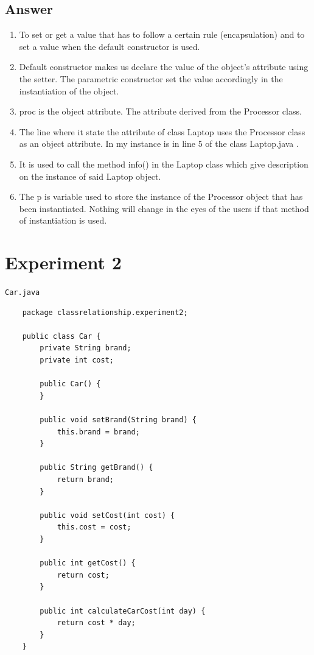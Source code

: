 \documentclass[12pt,titlepage]{article}
\begin{document}
\subsection{Answer}
\begin{enumerate}
    \item To set or get a value that has to follow a certain rule (encapsulation) and to set a value when the default constructor is used.
    \item Default constructor makes us declare the value of the object's attribute using the setter. The parametric constructor set the value accordingly in the instantiation of the object.
    \item proc is the object attribute. The attribute derived from the Processor class.
    \item The line where it state the attribute of class Laptop uses the Processor class as an object attribute. In my instance is in line 5 of the class Laptop.java .
    \item It is used to call the method info() in the Laptop class which give description on the instance of said Laptop object.
    \item The p is variable used to store the instance of the Processor object that has been instantiated. Nothing will change in the eyes of the users if that method of instantiation is used.
\end{enumerate}

\newpage
\section{Experiment 2}

\noindent \texttt{Car.java}
\begin{verbatim}
    package classrelationship.experiment2;

    public class Car {
        private String brand;
        private int cost;

        public Car() {
        }

        public void setBrand(String brand) {
            this.brand = brand;
        }

        public String getBrand() {
            return brand;
        }

        public void setCost(int cost) {
            this.cost = cost;
        }

        public int getCost() {
            return cost;
        }

        public int calculateCarCost(int day) {
            return cost * day;
        }
    }
\end{verbatim}
\end{document}
